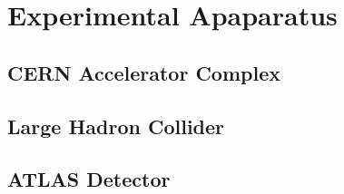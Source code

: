 \chapter{Experimental Apaparatus} 

\section{CERN Accelerator Complex}
\section{Large Hadron Collider}
\section{ATLAS Detector}
